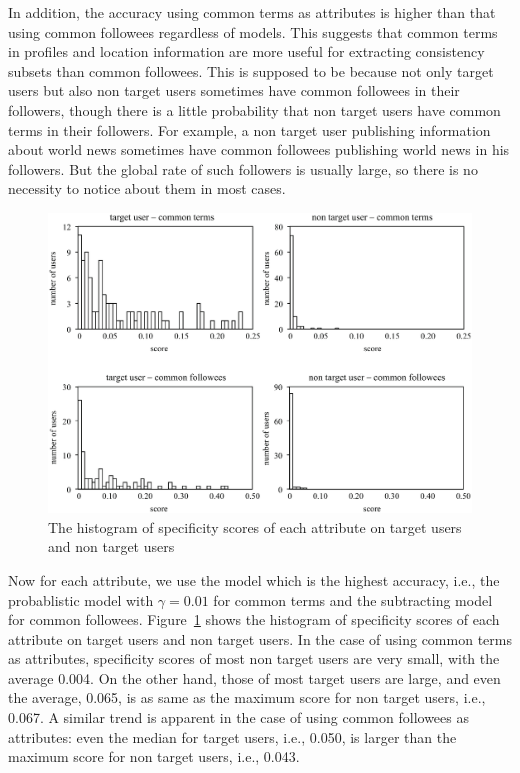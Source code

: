 In addition, the accuracy using common terms as attributes is higher
than that using common followees regardless of models.  This suggests
that common terms in profiles and location information are more useful for
extracting consistency subsets than common followees.  This is supposed
to be because not only target users but also non target users sometimes
have common followees in their followers, though there is a little
probability that non target users have common terms in their followers.
For example, a non target user publishing information about world news
sometimes have common followees publishing world news in
his followers.  But the global rate of such followers is usually
large, so there is no necessity to notice about them in most
cases.

{\footnotesize
\begin{figure}[t]
\begin{center}
\includegraphics[width=14cm]{images/histogram.eps}
 \caption{The histogram of specificity scores of each attribute on
 target users and non target users}
\label{fig:histogram}
\end{center}
\end{figure}
}

Now for each attribute, we use the model which is the highest accuracy,
i.e., the probablistic model with $\gamma=0.01$ for common terms and the
subtracting model for common
followees. Figure~\ref{fig:histogram} shows the histogram of specificity
scores of each attribute on target users and non target users.  In the
case of using common terms as attributes, specificity scores of most
non target users are very small, with the average 0.004.  On the other
hand, those of most target users are large, and even the average, 0.065,
is as same as the maximum score for non target users, i.e., 0.067.  A
similar trend is apparent in the case of using common followees as
attributes: even the median for target users, i.e., 0.050, is larger
than the maximum score for non target users, i.e., 0.043.

